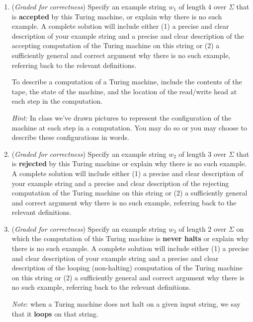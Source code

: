 \documentclass[12pt, oneside]{article}
\newcommand{\gradeCorrect}{({\it Graded for correctness}) }
\begin{document}
\begin{enumerate}[wide, labelwidth=!, labelindent=0pt]
    \begin{enumerate}

        \item\gradeCorrect Specify an example string $w_1$ of length $4$ over 
        $\Sigma$ that is {\bf accepted} by this Turing machine, or explain why there is no such 
        example. A complete solution will include either (1) a precise and clear 
        description of your example  string and a precise and clear description of the accepting computation
        of the Turing machine on this string or (2) a sufficiently
        general and correct argument why there is no such example, referring back to the relevant definitions.
        
        To describe a computation of a Turing machine, include the contents of the 
        tape, the state of the machine, and the location of the read/write head at each step in the computation.
        
        {\it Hint:} In class we've drawn pictures to represent the configuration of the machine at each step 
        in a computation.  You may do so or you may choose to describe these configurations in words.
        
        \item\gradeCorrect Specify an example string $w_2$ of length $3$ over $\Sigma$ 
        that is {\bf rejected} by this Turing machine
        or explain why there is no such 
        example. A complete solution will include either (1) a precise and clear 
        description of your example  string and a precise and clear description of the rejecting computation
        of the Turing machine on this string or (2) a sufficiently
        general and correct argument why there is no such example, referring back to the relevant definitions.

        \item\gradeCorrect Specify an example string $w_3$ of length $2$ over $\Sigma$ 
        on which  the computation of this Turing machine is {\bf never halts}
        or explain why there is no such 
        example. A complete solution will include either (1) a precise and clear 
        description of your example  string and a precise and clear description of the looping (non-halting) 
        computation
        of the Turing machine on this string or (2) a sufficiently
        general and correct argument why there is no such example, referring back to the relevant definitions.

        {\it Note}: when a Turing machine does not halt on a given input string, 
        we say that it {\bf loops} on that string.


\end{enumerate}
\end{enumerate}
\end{document}
